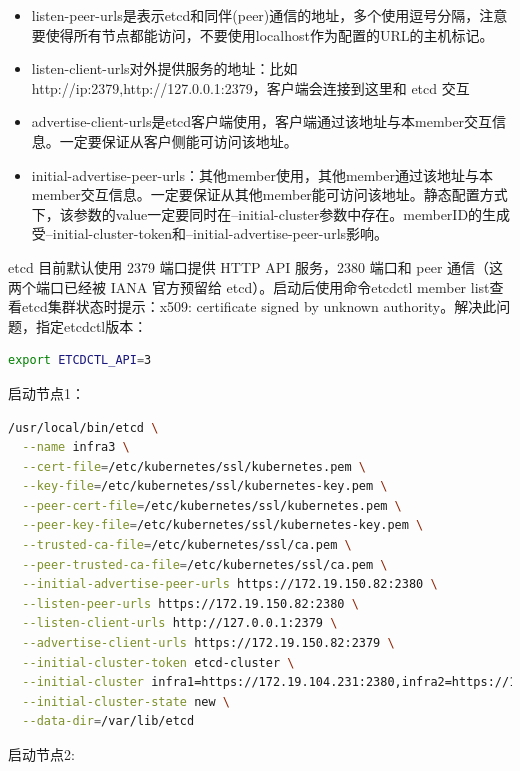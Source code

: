 \documentclass[8pt]{book}
\numberwithin{dummy}{section}
\theoremstyle{ocrenumbox}
\theoremstyle{blacknumex}
\theoremstyle{blacknumbox}
\theoremstyle{ocrenum}
\begin{document}
\begin{itemize}
\item{listen-peer-urls是表示etcd和同伴(peer)通信的地址，多个使用逗号分隔，注意要使得所有节点都能访问，不要使用localhost作为配置的URL的主机标记。}
\item{listen-client-urls对外提供服务的地址：比如 http://ip:2379,http://127.0.0.1:2379，客户端会连接到这里和 etcd 交互}
\item{advertise-client-urls是etcd客户端使用，客户端通过该地址与本member交互信息。一定要保证从客户侧能可访问该地址。}
\item{initial-advertise-peer-urls：其他member使用，其他member通过该地址与本member交互信息。一定要保证从其他member能可访问该地址。静态配置方式下，该参数的value一定要同时在–initial-cluster参数中存在。memberID的生成受–initial-cluster-token和–initial-advertise-peer-urls影响。}
\end{itemize}

etcd 目前默认使用 2379 端口提供 HTTP API 服务，2380 端口和 peer 通信（这两个端口已经被 IANA 官方预留给 etcd）。启动后使用命令etcdctl member list查看etcd集群状态时提示：x509: certificate signed by unknown authority。解决此问题，指定etcdctl版本：

\begin{lstlisting}[language=Bash]
export ETCDCTL_API=3
\end{lstlisting}

启动节点1：

\begin{lstlisting}[language=Bash]
/usr/local/bin/etcd \
  --name infra3 \
  --cert-file=/etc/kubernetes/ssl/kubernetes.pem \
  --key-file=/etc/kubernetes/ssl/kubernetes-key.pem \
  --peer-cert-file=/etc/kubernetes/ssl/kubernetes.pem \
  --peer-key-file=/etc/kubernetes/ssl/kubernetes-key.pem \
  --trusted-ca-file=/etc/kubernetes/ssl/ca.pem \
  --peer-trusted-ca-file=/etc/kubernetes/ssl/ca.pem \
  --initial-advertise-peer-urls https://172.19.150.82:2380 \
  --listen-peer-urls https://172.19.150.82:2380 \
  --listen-client-urls http://127.0.0.1:2379 \
  --advertise-client-urls https://172.19.150.82:2379 \
  --initial-cluster-token etcd-cluster \
  --initial-cluster infra1=https://172.19.104.231:2380,infra2=https://172.19.104.230:2380,infra3=https://172.19.150.82:2380 \
  --initial-cluster-state new \
  --data-dir=/var/lib/etcd
\end{lstlisting}

启动节点2:
\end{document}

